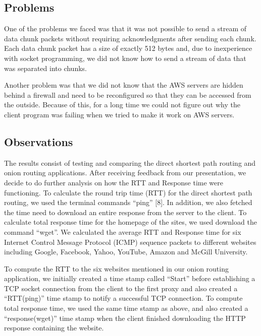 \documentclass{article}
\begin{document}
\subsection{Problems}
\noindent One of the problems we faced was that it was not possible to send a stream of data chunk packets without requiring acknowledgments after sending each chunk. Each data chunk packet has a size of exactly 512 bytes and, due to inexperience with socket programming, we did not know how to send a stream of data that was separated into chunks. \\

\vspace{0.3 cm}

\noindent Another problem was that we did not know that the AWS  servers are  hidden behind a firewall and need to be reconfigured so that they can be accessed from the outside. Because of this, for a long time we could not figure out why the client program was failing when we tried to make it work on AWS servers. \\

\subsection{Observations}
\noindent The results consist of testing and comparing the direct shortest path routing and onion routing applications. After receiving feedback from our presentation, we decide to do further analysis on how the RTT and Response time were functioning. To calculate the round trip time (RTT) for the direct shortest path routing, we used the terminal commands ``ping'' [8]. In addition, we  also fetched the time need to download an entire response from the server to the client. To calculate total response time for the homepage of the sites, we  used download the command ``wget''. We calculated the average RTT and Response time for six Internet Control Message Protocol (ICMP) sequence packets to different websites including Google, Facebook, Yahoo, YouTube, Amazon and McGill University. \\

\vspace{0.3 cm}

\noindent To compute the RTT to the six websites mentioned in our onion routing application, we initially created a time stamp called ``Start'' before establishing a TCP socket connection from the client to the first proxy and also created a ``RTT(ping)'' time stamp to notify a successful TCP connection. To compute total response time, we used the same time stamp as above, and also created a ``response(wget)'' time stamp when the client finished downloading the HTTP response containing the website. \\
\end{document}
